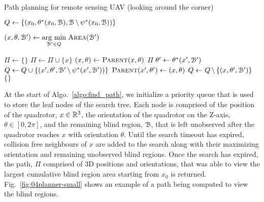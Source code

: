 \begin{algorithm}[h!]
    \caption{Path planning for remote sensing UAV (looking around the corner)}
    \label{algo:find_path}
    \begin{algorithmic}[1]
        \setcounter{ALC@line}{0}

        \STATE $Q \leftarrow \{(x_0, \theta^*(x_0, {{\mathcal{B}}}),
            {{\mathcal{B}}} \, \backslash \, \psi^*(x_0, {{\mathcal{B}}}))\}$

        \STATE $(x, \theta, {{\mathcal{B'}}}) \leftarrow \underset{{{\mathcal{B'}}} \in Q}{\operatorname{arg}\,\operatorname{min}}\; {\textsc{Area}}({{\mathcal{B'}}})$

                \STATE $\Pi \leftarrow \{\}$
                    \STATE $\Pi \leftarrow \Pi \cup \{x\}$
                    \STATE $(x, \theta) \leftarrow {\textsc{Parent}}(x, \theta)$
                \ENDWHILE
                \RETURN $\Pi$
            \ENDIF
            \STATE $\theta' \leftarrow \theta^*(x', {{\mathcal{B'}}})$
            \STATE $Q \leftarrow Q \cup \{(x', \theta', {{\mathcal{B'}}} \, \backslash \,
                    \psi^*(x', {{\mathcal{B'}}}))\}$
                \STATE ${\textsc{Parent}}(x', \theta') \leftarrow (x, \theta)$
            \ENDFOR
            \STATE $Q \leftarrow Q \, \backslash \, \{(x, \theta', {{\mathcal{B'}}})\}$
        \ENDWHILE
        \RETURN $\{\}$

    \end{algorithmic}
\end{algorithm}

At the start of Algo.~\ref{algo:find_path}, we initialize a priority queue that
is used to store the leaf nodes of the search tree. Each node is comprised of
the position of the quadrotor, $x \in \mathbb{R}^3$, the orientation of the quadrotor
on the Z-axis, $\theta \in [0, 2\pi]$, and the remaining blind region, ${{\mathcal{B}}}$,
that is left unobserved after the quadrotor reaches $x$ with orientation
$\theta$. Until the search timeout has expired, collision free neighbours of
$x$ are added to the search along with their maximizing orientation and
remaining unobserved blind regions.  Once the search has expired, the path,
$\Pi$ comprised of 3D positions and orientations, that was able to view the
largest cumulative blind region area starting from $x_0$ is returned.
Fig.~\ref{fig:04planner-small} shows an example of a path being computed to
view the blind regions.

